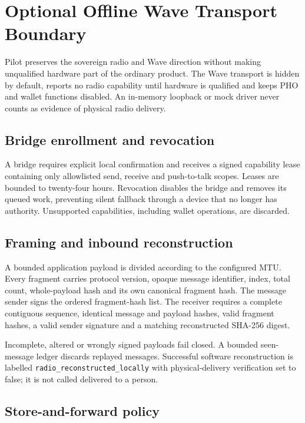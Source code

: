 \section{Optional Offline Wave Transport Boundary}
\label{sec:pilot-mobile-wave-transport}

Pilot preserves the sovereign radio and Wave direction without making unqualified
hardware part of the ordinary product.  The Wave transport is hidden by default,
reports no radio capability until hardware is qualified and keeps PHO and wallet
functions disabled.  An in-memory loopback or mock driver never counts as evidence
of physical radio delivery.

\subsection{Bridge enrollment and revocation}

A bridge requires explicit local confirmation and receives a signed capability
lease containing only allowlisted send, receive and push-to-talk scopes.  Leases are
bounded to twenty-four hours.  Revocation disables the bridge and removes its queued
work, preventing silent fallback through a device that no longer has authority.
Unsupported capabilities, including wallet operations, are discarded.

\subsection{Framing and inbound reconstruction}

A bounded application payload is divided according to the configured MTU.  Every
fragment carries protocol version, opaque message identifier, index, total count,
whole-payload hash and its own canonical fragment hash.  The message sender signs
the ordered fragment-hash list.  The receiver requires a complete contiguous
sequence, identical message and payload hashes, valid fragment hashes, a valid
sender signature and a matching reconstructed SHA-256 digest.

Incomplete, altered or wrongly signed payloads fail closed.  A bounded seen-message
ledger discards replayed messages.  Successful software reconstruction is labelled
\texttt{radio\_reconstructed\allowbreak\_locally} with physical-delivery
verification set to false; it is not called delivered to a person.

\subsection{Store-and-forward policy}

